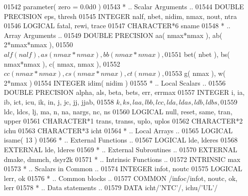 \begin{DoxyCode}
01542       parameter( zero = 0.0d0 )
01543 \textcolor{comment}{*     .. Scalar Arguments ..}
01544       \textcolor{keywordtype}{DOUBLE PRECISION}   eps, thresh
01545       \textcolor{keywordtype}{INTEGER}            nalf, nbet, nidim, nmax, nout, ntra
01546       \textcolor{keywordtype}{LOGICAL}            fatal, rewi, trace
01547       \textcolor{keywordtype}{CHARACTER*6}        sname
01548 \textcolor{comment}{*     .. Array Arguments ..}
01549       \textcolor{keywordtype}{DOUBLE PRECISION}   aa( nmax*nmax ), ab( 2*nmax*nmax ),
01550      $                   alf( nalf ), as( nmax*nmax ), bb( nmax*nmax ),
01551      $                   bet( nbet ), bs( nmax*nmax ), c( nmax, nmax ),
01552      $                   cc( nmax*nmax ), cs( nmax*nmax ), ct( nmax ),
01553      $                   g( nmax ), w( 2*nmax )
01554       \textcolor{keywordtype}{INTEGER}            idim( nidim )
01555 \textcolor{comment}{*     .. Local Scalars ..}
01556       \textcolor{keywordtype}{DOUBLE PRECISION}   alpha, als, beta, bets, err, errmax
01557       \textcolor{keywordtype}{INTEGER}            i, ia, ib, ict, icu, ik, in, j, jc, jj, jjab,
01558      $                   k, ks, laa, lbb, lcc, lda, ldas, ldb, ldbs,
01559      $                   ldc, ldcs, lj, ma, n, na, nargs, nc, ns
01560       \textcolor{keywordtype}{LOGICAL}            null, reset, same, tran, upper
01561       \textcolor{keywordtype}{CHARACTER*1}        trans, transs, uplo, uplos
01562       \textcolor{keywordtype}{CHARACTER*2}        ichu
01563       \textcolor{keywordtype}{CHARACTER*3}        icht
01564 \textcolor{comment}{*     .. Local Arrays ..}
01565       \textcolor{keywordtype}{LOGICAL}            isame( 13 )
01566 \textcolor{comment}{*     .. External Functions ..}
01567       \textcolor{keywordtype}{LOGICAL}            lde, lderes
01568       \textcolor{keywordtype}{EXTERNAL}           lde, lderes
01569 \textcolor{comment}{*     .. External Subroutines ..}
01570       \textcolor{keywordtype}{EXTERNAL}           dmake, dmmch, dsyr2k
01571 \textcolor{comment}{*     .. Intrinsic Functions ..}
01572       \textcolor{keywordtype}{INTRINSIC}          max
01573 \textcolor{comment}{*     .. Scalars in Common ..}
01574       \textcolor{keywordtype}{INTEGER}            infot, noutc
01575       \textcolor{keywordtype}{LOGICAL}            lerr, ok
01576 \textcolor{comment}{*     .. Common blocks ..}
01577       \textcolor{keyword}{COMMON}             /infoc/infot, noutc, ok, lerr
01578 \textcolor{comment}{*     .. Data statements ..}
01579       \textcolor{keyword}{DATA}               icht/\textcolor{stringliteral}{'NTC'}/, ichu/\textcolor{stringliteral}{'UL'}/

\end{DoxyCode}
